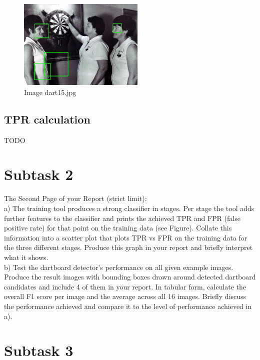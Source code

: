\documentclass[conference]{IEEEtran}
\begin{document}
\begin{figure}[ht!]
\centering
\includegraphics[width=60mm]{img/detected_dart15.jpg}
\caption{Image dart15.jpg \label{img_face_15}}
\end{figure}

\subsection{TPR calculation}

TODO

\newpage

\section{Subtask 2}

The Second Page of your Report (strict limit):\\
a) The training tool produces a strong classifier in stages. Per
stage the tool adds further features to the classifier and
prints the achieved TPR and FPR (false positive rate) for
that point on the training data (see Figure). Collate this
information into a scatter plot that plots TPR vs FPR on the
training data for the three different stages. Produce this
graph in your report and briefly interpret what it shows.\\
b) Test the dartboard detector’s performance on all given
example images. Produce the result images with bounding
boxes drawn around detected dartboard candidates and
include 4 of them in your report. In tabular form, calculate
the overall F1 score per image and the average across all
16 images. Briefly discuss the performance achieved and
compare it to the level of performance achieved in a).

\section{Subtask 3}
\end{document}
